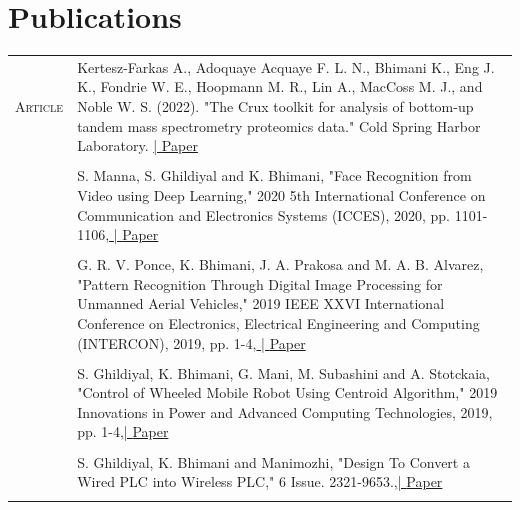 \documentclass[a4paper,10pt]{article} %
\begin{document}

\section{Publications}
\begin{tabular}{r|p{12cm}}
    \textsc{Article} & Kertesz-Farkas A., Adoquaye Acquaye F. L. N., Bhimani K., Eng J. K., Fondrie W. E., Hoopmann M. R., Lin A., MacCoss M. J., and Noble W. S. (2022). "The Crux toolkit for analysis of bottom-up tandem mass spectrometry proteomics data." Cold Spring Harbor Laboratory. \href{https://pubs.acs.org/doi/full/10.1021/acs.jproteome.2c00615}{\qquad \qquad \qquad \qquad \qquad \qquad \qquad\;\;| \footnotesize{Paper}}\\ \multicolumn{2}{c}{}\\
    & S. Manna, S. Ghildiyal and K. Bhimani, "Face Recognition from Video using Deep Learning," 2020 5th International Conference on Communication and Electronics Systems (ICCES), 2020, pp. 1101-1106,\href{https://ieeexplore.ieee.org/abstract/document/9137927}{ \qquad \qquad \qquad \qquad \qquad \;\;\;| \footnotesize{Paper}}\\ \multicolumn{2}{c}{}\\
    & G. R. V. Ponce, K. Bhimani, J. A. Prakosa and M. A. B. Alvarez, "Pattern Recognition Through Digital Image Processing for Unmanned Aerial Vehicles," 2019 IEEE XXVI International Conference on Electronics, Electrical Engineering and Computing (INTERCON), 2019, pp. 1-4,\href{https://ieeexplore.ieee.org/abstract/document/8853558}{\qquad \qquad \qquad \qquad \qquad \qquad \qquad \;\;\; | \footnotesize{Paper}}\\ \multicolumn{2}{c}{}\\
    & S. Ghildiyal, K. Bhimani, G. Mani, M. Subashini and A. Stotckaia, "Control of Wheeled Mobile Robot Using Centroid Algorithm," 2019 Innovations in Power and Advanced Computing Technologies, 2019, pp. 1-4,\href{https://ieeexplore.ieee.org/abstract/document/8959523}{\hfill | \footnotesize{Paper}}\\ \multicolumn{2}{c}{}\\
    & S. Ghildiyal, K. Bhimani and Manimozhi, "Design To Convert a Wired PLC into Wireless PLC," 6 Issue. 2321-9653.,\href{https://www.ijraset.com/fileserve.php?FID=13054}{\hfill | \footnotesize{Paper}}\\ \multicolumn{2}{c}{}\\
    
\end{tabular}
\end{document}
